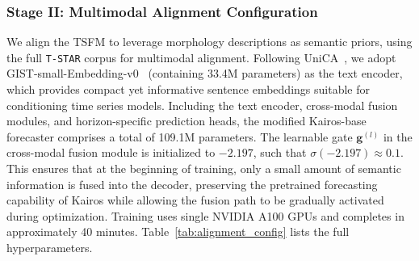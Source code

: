 \documentclass[11pt]{article}
\begin{document}
\subsubsection{Stage II: Multimodal Alignment Configuration}

We align the TSFM to leverage morphology descriptions as semantic priors, using the full \texttt{T-STAR} corpus for multimodal alignment.
Following UniCA~\citep{han2025unica}, we adopt GIST-small-Embedding-v0~\citep{solatorio2024gistembed} (containing 33.4M parameters) as the text encoder, which provides compact yet informative sentence embeddings suitable for conditioning time series models.
Including the text encoder, cross-modal fusion modules, and horizon-specific prediction heads, the modified Kairos-base forecaster comprises a total of 109.1M parameters.
The learnable gate $\boldsymbol{g}^{(l)}$ in the cross-modal fusion module is initialized to $-2.197$, such that $\sigma(-2.197) \approx 0.1$.
This ensures that at the beginning of training, only a small amount of semantic information is fused into the decoder, preserving the pretrained forecasting capability of Kairos while allowing the fusion path to be gradually activated during optimization.
Training uses single NVIDIA A100 GPUs and completes in approximately 40 minutes.
Table~\ref{tab:alignment_config} lists the full hyperparameters.

\begin{table}[htbp]
\centering
\small
\caption{Hyperparameters for Stage~II multimodal alignment.}
\label{tab:alignment_config}
\end{table}
\end{document}
